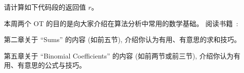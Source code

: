 \documentclass[a4paper, justified]{tufte-handout}
\begin{document}
\begin{problem}[CS 1.5-12]
\end{problem}

\begin{solution}
\end{solution}

\beginoptional

\begin{problem}[Summation]
  请计算如下代码段的返回值 $r$。

  
\end{problem}

\begin{solution}
\end{solution}

\beginot

本周两个 OT 的目的是向大家介绍在算法分析中常用的数学基础。
阅读书籍~\cite{Book:GKP}:
\begin{ot}[Sums]
第二章关于 ``Sums'' 的内容 (如前五节), 介绍你认为有用、有意思的求和技巧。
\end{ot}

\vspace{0.50cm}
\begin{ot}
第五章关于 ``Binomial Coefficients'' 的内容 (如前两节或前三节), 介绍你认为有用、有意思的公式与技巧。
\end{ot}




\beginfb



\end{document}
